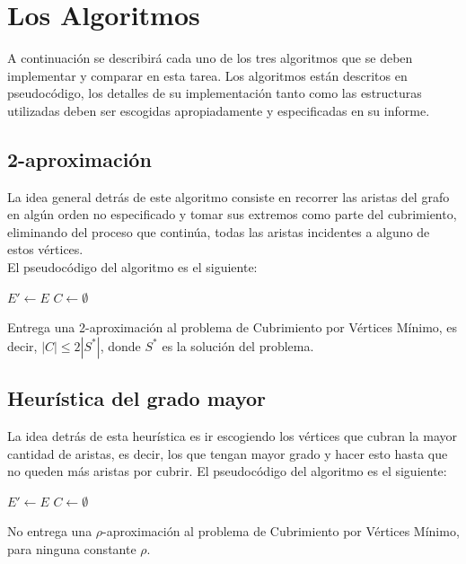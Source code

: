 \documentclass[dcc,uchile]{fcfmcourse}
\begin{document}
\section{Los Algoritmos}
A continuación se describirá cada uno de los tres algoritmos que se deben implementar y comparar en esta tarea. Los algoritmos están descritos en pseudocódigo, los detalles de su implementación tanto como las estructuras utilizadas deben ser escogidas apropiadamente y especificadas en su informe.
\subsection*{2-aproximación}
La idea general detrás de este algoritmo consiste en recorrer las aristas del grafo en algún orden no especificado y tomar sus extremos como parte del cubrimiento, eliminando del proceso que continúa, todas las aristas incidentes a alguno de estos vértices.\\

El pseudocódigo del algoritmo es el siguiente:\\

\begin{algorithm}[H]

\SetAlgoLined
{}
 $E'\gets E$\;
 $C\gets \emptyset$\;
 \caption{Entrega una 2-aproximación al problema de Cubrimiento por Vértices Mínimo, es decir, $|C|\le 2|S^*|$, donde $S^*$ es la solución del problema.}
 
\end{algorithm}


\subsection*{Heurística del grado mayor}
La idea detrás de esta heurística es ir escogiendo los vértices que cubran la mayor cantidad de aristas, es decir, los que tengan mayor grado y hacer esto hasta que no queden más aristas por cubrir.
\newpage
El pseudocódigo del algoritmo es el siguiente:\\

\begin{algorithm}[H]


\SetAlgoLined
{}
 $E'\gets E$\;
 $C\gets \emptyset$\;
 \caption{No entrega una $\rho$-aproximación al problema de Cubrimiento por Vértices Mínimo, para ninguna constante $\rho$.}
 
 
\end{algorithm}
\end{document}
